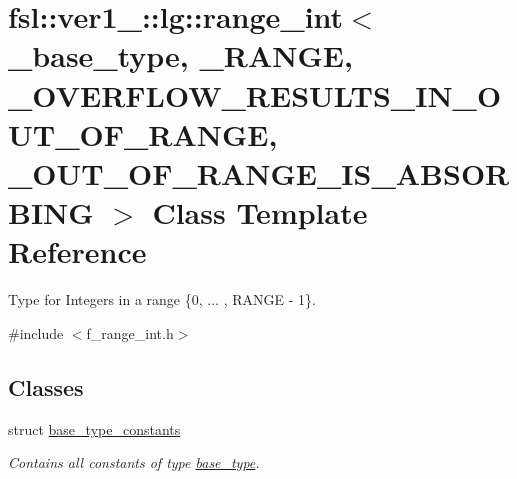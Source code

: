 \hypertarget{classfsl_1_1ver1__0_1_1lg_1_1range__int}{}\section{fsl\+::ver1\+\_\+::lg\+::range\+\_\+int$<$ \+\_\+base\+\_\+type, \+\_\+\+R\+A\+N\+GE, \+\_\+\+O\+V\+E\+R\+F\+L\+O\+W\+\_\+\+R\+E\+S\+U\+L\+T\+S\+\_\+\+I\+N\+\_\+\+O\+U\+T\+\_\+\+O\+F\+\_\+\+R\+A\+N\+GE, \+\_\+\+O\+U\+T\+\_\+\+O\+F\+\_\+\+R\+A\+N\+G\+E\+\_\+\+I\+S\+\_\+\+A\+B\+S\+O\+R\+B\+I\+NG $>$ Class Template Reference}
\label{classfsl_1_1ver1__0_1_1lg_1_1range__int}


Type for Integers in a range \{0, ... , R\+A\+N\+GE -\/ 1\}.  




{\ttfamily \#include $<$f\+\_\+range\+\_\+int.\+h$>$}

\subsection*{Classes}
\begin{DoxyCompactItemize}
\item 
struct \mbox{\hyperlink{structfsl_1_1ver1__0_1_1lg_1_1range__int_1_1base__type__constants}{base\+\_\+type\+\_\+constants}}
\begin{DoxyCompactList}\small\item\em Contains all constants of type \mbox{\hyperlink{classfsl_1_1ver1__0_1_1lg_1_1range__int_af14c814b65a761cd387e7577eb2ef78c}{base\+\_\+type}}. \end{DoxyCompactList}\end{DoxyCompactItemize}
